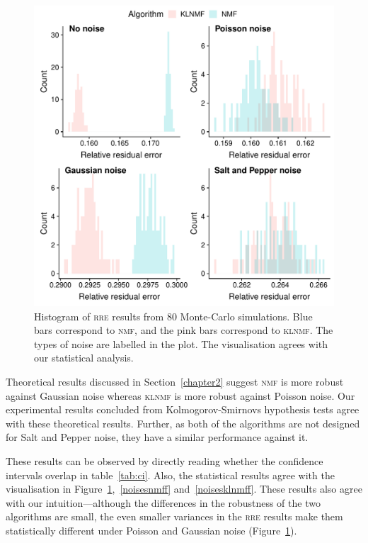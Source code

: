 \begin{figure}
{\centering
\includegraphics[scale=0.8]{histo}
\caption{Histogram of \textsc{rre} results from 80 Monte-Carlo simulations. Blue bars correspond to \textsc{nmf}, and the pink bars correspond to \textsc{klnmf}. The types of noise are labelled in the plot. The visualisation agrees with our statistical analysis.}
\label{histo}}
\end{figure}

Theoretical results discussed in Section~\ref{chapter2} suggest \textsc{nmf} is more robust against Gaussian noise whereas \textsc{klnmf} is more robust against Poisson noise. Our experimental results concluded from Kolmogorov-Smirnovs hypothesis tests agree with these theoretical results. Further, as both of the algorithms are not designed for Salt and Pepper noise, they have a similar performance against it.

These results can be observed by directly reading whether the confidence intervals overlap in table~\ref{tab:ci}. Also, the statistical results agree with the visualisation in Figure~\ref{histo},~\ref{noisesnmff} and~\ref{noisesklnmff}. These results also agree with our intuition---although the differences in the robustness of the two algorithms are small, the even smaller variances in the \textsc{rre} results make them statistically different under Poisson and Gaussian noise (Figure~\ref{histo}).


